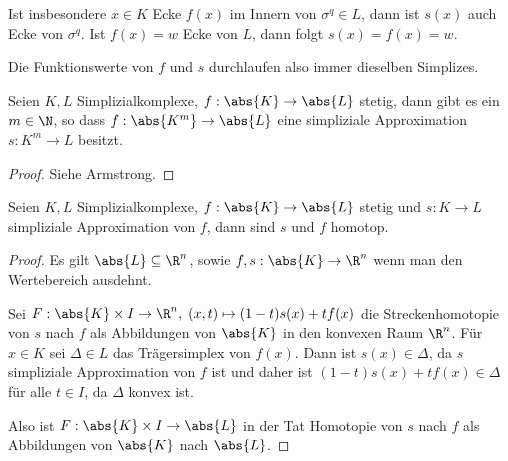 Ist insbesondere $x\in K$ Ecke $f(x)$ im Innern von $\sigma^q\in L$, dann ist
$s(x)$ auch Ecke von $\sigma^q$. Ist $f(x) = w$ Ecke von $L$, dann folgt
$s(x)=f(x)=w$.

Die Funktionswerte von $f$ und $s$ durchlaufen also immer dieselben Simplizes.

\begin{prop}
\label{prop:4.2.4}
Seien $K,L$ Simplizialkomplexe, $f: \abs{K}\to\abs{L}$ stetig, dann gibt es ein
$m\in\N$, so dass $f: \abs{K^m}\to\abs{L}$ eine simpliziale Approximation $s:
K^m\to L$ besitzt.\fishhere
\end{prop}
\begin{proof}
Siehe Armstrong.\qedhere
\end{proof}

\begin{prop}
\label{prop:4.2.5}
Seien $K,L$ Simplizialkomplexe, $f: \abs{K}\to\abs{L}$ stetig und $s: K\to L$
simpliziale Approximation von $f$, dann sind $s$ und $f$ homotop.\fishhere
\end{prop}
\begin{proof}
Es gilt $\abs{L}\subseteq\R^n$, sowie $f,s: \abs{K}\to\R^n$ wenn man den
Wertebereich ausdehnt.

Sei $F: \abs{K}\times I\to \R^n,\; (x,t)\mapsto (1-t)s(x)+tf(x)$ die
Streckenhomotopie von $s$ nach $f$ als Abbildungen von $\abs{K}$ in den
konvexen Raum $\R^n$. Für $x\in K$ sei $\Delta\in L$ das Trägersimplex von
$f(x)$. Dann ist $s(x)\in\Delta$, da $s$ simpliziale Approximation von $f$ ist
und daher ist $(1-t)s(x)+tf(x)\in\Delta$ für alle $t\in I$, da $\Delta$ konvex
ist.

Also ist $F: \abs{K}\times I\to \abs{L}$ in der Tat Homotopie von $s$ nach $f$
als Abbildungen von $\abs{K}$ nach $\abs{L}$.\qedhere
\end{proof}

